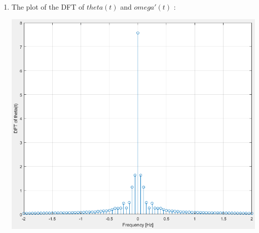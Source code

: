 \documentclass[a4paper,12pt]{article}
\begin{document}
\begin{enumerate}[label={\color{blue}\arabic*)}]
\begin{multicols}{2}
    \end{multicols}
    To get the plots :
    \begin{lstlisting}[style=Matlab-editor,language=Matlab, basicstyle=\small\ttfamily]
t_ang=0:Te2:Te(end)-Te2;

figure(6)
plot(t_ang, theta)
xlabel('Time [sec]')
ylabel('Angular position [rad]')
grid on

figure(7)
plot(Te,wd)
xlabel('Time [sec]')
ylabel('Angular acceleration [rad/s^2]')
grid on
        \end{lstlisting}
    

    \item
    The plot of the DFT of \(theta(t)\) and \(omega'(t)\) :
    \begin{multicols}{2}
    \begin{flushleft}
            \includegraphics[width=1\linewidth]{Images/DFT_theta.png}
            \label{Figure11}
        \end{flushleft}
    \columnbreak
    \begin{flushright}

\end{flushright}
\end{multicols}
\end{enumerate}
\end{document}
